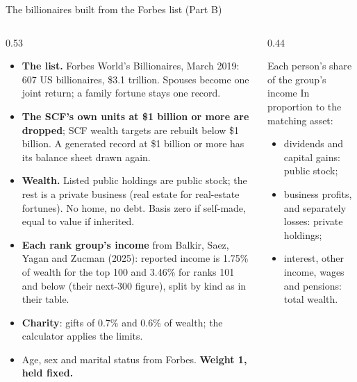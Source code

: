 \begin{frame}{The billionaires built from the Forbes list (Part B)}
  \scriptsize
  \setlength{\itemsep}{0pt}
  \begin{columns}[T]
    \begin{column}{0.53\textwidth}
      \begin{itemize}\setlength{\itemsep}{1pt}
        \item \textbf{The list.} Forbes World's Billionaires, March 2019: 607 US billionaires,
              \$3.1 trillion. Spouses become one joint return; a family fortune stays one record.
        \item \textbf{The SCF's own units at \$1 billion or more are dropped}; SCF wealth targets are
              rebuilt below \$1 billion. A generated record at \$1 billion or more has its balance sheet
              drawn again.
        \item \textbf{Wealth.} Listed public holdings are public stock; the rest is a private business
              (real estate for real-estate fortunes). No home, no debt. Basis zero if self-made, equal to
              value if inherited.
        \item \textbf{Each rank group's income} from Balkir, Saez, Yagan and Zucman (2025): reported
              income is 1.75\% of wealth for the top 100 and 3.46\% for ranks 101 and below (their
              next-300 figure), split by kind as in their table.
        \item \textbf{Charity}: gifts of 0.7\% and 0.6\% of wealth; the calculator applies the limits.
        \item Age, sex and marital status from Forbes. \textbf{Weight 1, held fixed.}
      \end{itemize}
    \end{column}
    \begin{column}{0.44\textwidth}
      \begin{block}{Each person's share of the group's income}
        In proportion to the matching asset:
        \begin{itemize}\setlength{\itemsep}{0pt}
          \item dividends and capital gains: public stock;
          \item business profits, and separately losses: private holdings;
          \item interest, other income, wages and pensions: total wealth.

\end{itemize}
\end{block}
\end{column}
\end{columns}
\end{frame}
